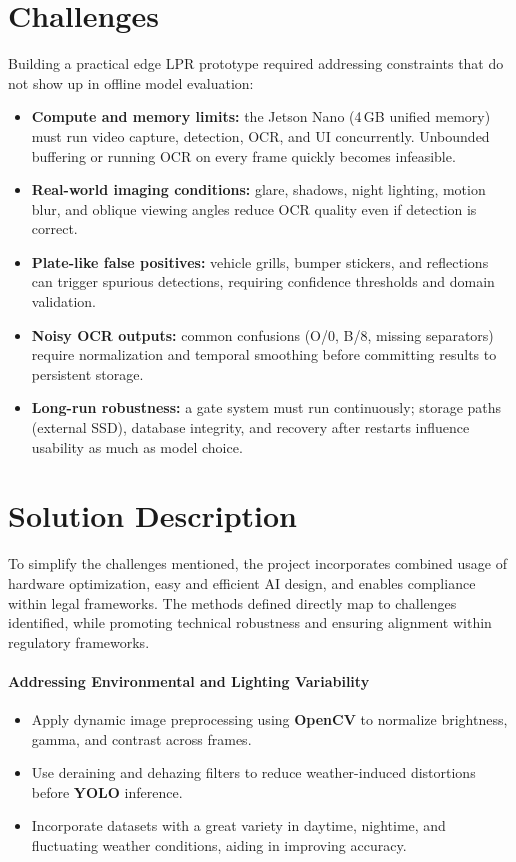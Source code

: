 \section{Challenges}
Building a practical edge \ac{LPR} prototype required addressing constraints that do not show up in offline model evaluation:
\begin{itemize}
	\item \textbf{Compute and memory limits:} the Jetson Nano (4\,GB unified memory) must run video capture, detection, \ac{OCR}, and UI concurrently. Unbounded buffering or running \ac{OCR} on every frame quickly becomes infeasible.
	\item \textbf{Real-world imaging conditions:} glare, shadows, night lighting, motion blur, and oblique viewing angles reduce \ac{OCR} quality even if detection is correct.
	\item \textbf{Plate-like false positives:} vehicle grills, bumper stickers, and reflections can trigger spurious detections, requiring confidence thresholds and domain validation.
	\item \textbf{Noisy \ac{OCR} outputs:} common confusions (O/0, B/8, missing separators) require normalization and temporal smoothing before committing results to persistent storage.
	\item \textbf{Long-run robustness:} a gate system must run continuously; storage paths (external SSD), database integrity, and recovery after restarts influence usability as much as model choice.
\end{itemize}

\section{Solution Description}
To simplify the challenges mentioned, the project incorporates combined usage of hardware optimization, easy and efficient \ac{AI} design, and enables compliance within legal frameworks.  
The methods defined directly map to challenges identified, while promoting technical robustness and ensuring alignment within regulatory frameworks.

\paragraph{Addressing Environmental and Lighting Variability}
\begin{itemize}
	\item Apply dynamic image preprocessing using \textbf{OpenCV} to normalize brightness, gamma, and contrast across frames.
	\item Use deraining and dehazing filters to reduce weather-induced distortions before \textbf{YOLO} inference.
	\item Incorporate datasets with a great variety in daytime, nightime, and fluctuating weather conditions, aiding in improving accuracy.
\end{itemize}

